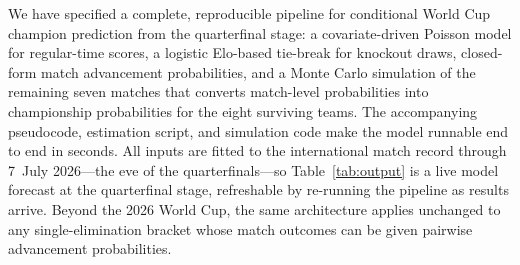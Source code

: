 \documentclass[11pt]{article}
\begin{document}
We have specified a complete, reproducible pipeline for conditional World Cup
champion prediction from the quarterfinal stage: a covariate-driven Poisson
model for regular-time scores, a logistic Elo-based tie-break for knockout
draws, closed-form match advancement probabilities, and a Monte Carlo
simulation of the remaining seven matches that converts match-level
probabilities into championship probabilities for the eight surviving teams.
The accompanying pseudocode, estimation script, and simulation code make the
model runnable end to end in seconds. All inputs are fitted to the
international match record through 7~July 2026---the eve of the
quarterfinals---so Table~\ref{tab:output} is a live model forecast at the
quarterfinal stage, refreshable by re-running the pipeline as results
arrive. Beyond the 2026 World Cup, the same architecture
applies unchanged to any single-elimination bracket whose match outcomes can
be given pairwise advancement probabilities.

\appendix




\end{document}
